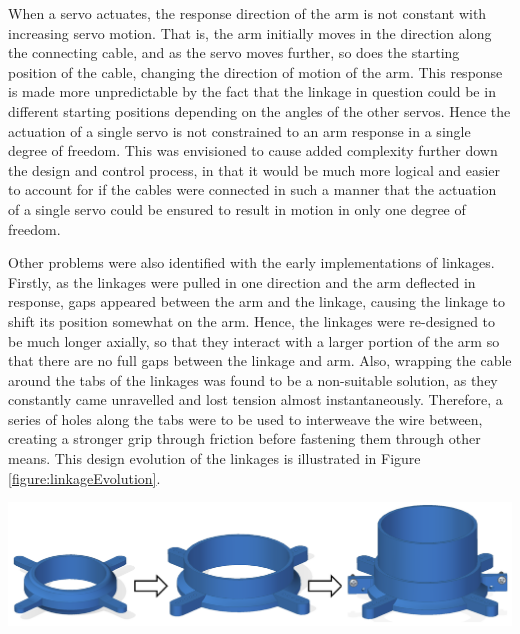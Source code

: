 \documentclass[11pt]{article}
\begin{document}
When a servo actuates, the response direction of the arm is not constant with increasing servo motion. That is, the arm initially moves in the direction along the connecting cable, and as the servo moves further, so does the starting position of the cable, changing the direction of motion of the arm. This response is made more unpredictable by the fact that the linkage in question could be in different starting positions depending on the angles of the other servos. Hence the actuation of a single servo is not constrained to an arm response in a single degree of freedom. This was envisioned to cause added complexity further down the design and control process, in that it would be much more logical and easier to account for if the cables were connected in such a manner that the actuation of a single servo could be ensured to result in motion in only one degree of freedom.

Other problems were also identified with the early implementations of linkages. Firstly, as the linkages were pulled in one direction and the arm deflected in response, gaps appeared between the arm and the linkage, causing the linkage to shift its position somewhat on the arm. Hence, the linkages were re-designed to be much longer axially, so that they interact with a larger portion of the arm so that there are no full gaps between the linkage and arm. Also, wrapping the cable around the tabs of the linkages was found to be a non-suitable solution, as they constantly came unravelled and lost tension almost instantaneously. Therefore, a series of holes along the tabs were to be used to interweave the wire between, creating a stronger grip through friction before fastening them through other means. This design evolution of the linkages is illustrated in Figure \ref{figure:linkageEvolution}.

\begin{center}
\includegraphics[width=\textwidth]{images/linkageEvolution.png}
\label{figure:linkageEvolution}
\end{center}
\end{document}

